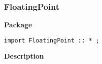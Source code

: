 \subsubsection{FloatingPoint}
\label{sec-FloatingPoint}

{\bf Package}

\begin{verbatim}
import FloatingPoint :: * ;
\end{verbatim}

{\bf Description}
